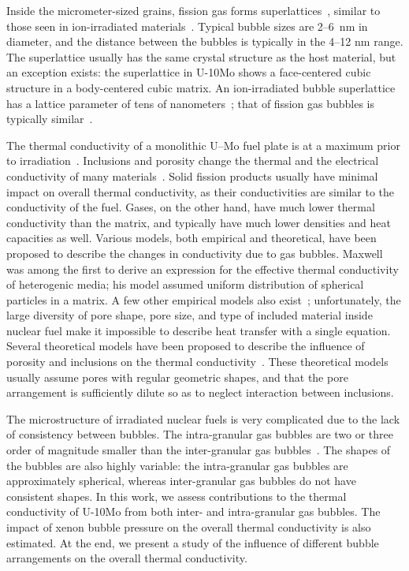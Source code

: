 Inside the micrometer-sized grains, fission gas forms superlattices~\cite{gan2012tem,miller2015transmission,miller2012advantages},
similar to those seen in ion-irradiated materials~\cite{johnson1980gas, johnson1980hydrogen, evans1983void, mazey1986bubble, evans1986solid, johnson1991image, johnson1995gas, lawson1998temperature, ghoniem2001theory,johnson2006helium}. Typical bubble sizes are 2--6~nm in diameter, and the distance between the bubbles is typically in the 4--12 nm range. The superlattice usually has the same crystal structure as the host material, but an exception exists: the superlattice in U-10Mo shows a face-centered cubic structure in a body-centered cubic matrix. An ion-irradiated bubble superlattice has a lattice parameter of tens of nanometers~\cite{miller2015transmission}; that of fission gas bubbles is
typically similar~\cite{Gan2015}.

The thermal conductivity of a monolithic U--Mo fuel plate is at a maximum prior to irradiation~\cite{burkes2015thermal}.
Inclusions and porosity change the thermal and the electrical conductivity of many materials~\cite{bakker1997using}. 
Solid fission products usually have minimal impact on overall thermal conductivity, as their conductivities are similar to the conductivity of the fuel. Gases, on the other hand, have much lower thermal conductivity than
the matrix, and typically have much lower densities and heat capacities as well. Various models, both empirical and theoretical, have been proposed to describe the changes in conductivity due to gas bubbles. Maxwell~\cite{maxwell1881treatise} was among the first to derive an expression for the effective thermal conductivity of heterogenic media; his model assumed uniform distribution of spherical particles in a matrix. A few other empirical models also exist~\cite{macewan1967effect,goldsmith1973measurements,devries1989experimental}; unfortunately, the large diversity of pore shape, pore size, and type of included material inside nuclear fuel make it impossible to describe heat transfer with a single equation. Several theoretical models have been proposed to describe the influence of porosity and inclusions on the thermal conductivity~\cite{maxwell1881treatise,loeb1954thermal, cunningham1981heat, tzou1991effect, bauer1993general}. These theoretical models usually assume pores with regular geometric shapes, and that the pore arrangement is sufficiently dilute so as to neglect interaction between inclusions.

The microstructure of irradiated nuclear fuels is very complicated due to the lack of consistency between bubbles. The intra-granular gas bubbles are two or three order of magnitude smaller than the inter-granular gas bubbles~\cite{hu2015assessment}. The shapes of the bubbles are also highly variable: the intra-granular gas bubbles are approximately spherical, whereas inter-granular gas bubbles do not have consistent shapes. In this work, we assess contributions to the thermal conductivity of U-10Mo from both inter- and intra-granular gas bubbles. The impact of xenon bubble pressure on the overall thermal conductivity is also estimated. At the end, we present a study of the influence of different bubble arrangements on the overall thermal conductivity.

